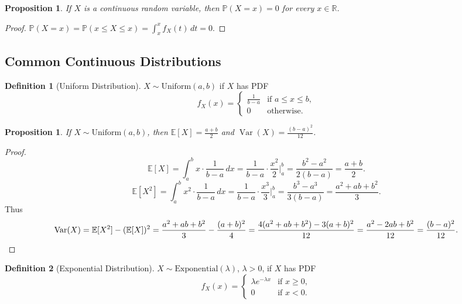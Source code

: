 \documentclass[11pt,a4paper]{article}
\theoremstyle{definition}
\newtheorem{definition}{Definition}[section]
\theoremstyle{plain}
\newtheorem{proposition}[theorem]{Proposition}
\theoremstyle{remark}
\newcommand{\R}{\mathbb{R}}
\newcommand{\E}{\mathbb{E}}
\newcommand{\Prob}{\mathbb{P}}
\DeclareMathOperator{\Var}{Var}
\begin{document}
\begin{proposition}
\label{prop:continuous_point_zero}
If $X$ is a continuous random variable, then $\Prob(X = x) = 0$ for every $x \in \R$.
\end{proposition}

\begin{proof}
$\Prob(X = x) = \Prob(x \leq X \leq x) = \int_x^x f_X(t)\,dt = 0$.
\end{proof}

\subsection{Common Continuous Distributions}

\begin{definition}[Uniform Distribution]
\label{def:uniform}
$X \sim \mathrm{Uniform}(a, b)$ if $X$ has PDF
\[
    f_X(x) = \begin{cases} \frac{1}{b - a} & \text{if } a \leq x \leq b, \\ 0 & \text{otherwise.} \end{cases}
\]
\end{definition}

\begin{proposition}
\label{prop:uniform_moments}
If $X \sim \mathrm{Uniform}(a, b)$, then $\E[X] = \frac{a+b}{2}$ and
$\Var(X) = \frac{(b-a)^2}{12}$.
\end{proposition}

\begin{proof}
\[
    \E[X] = \int_a^b x \cdot \frac{1}{b-a}\,dx = \frac{1}{b-a}\cdot\frac{x^2}{2}\bigg|_a^b
    = \frac{b^2 - a^2}{2(b-a)} = \frac{a + b}{2}.
\]
\[
    \E[X^2] = \int_a^b x^2 \cdot \frac{1}{b-a}\,dx = \frac{1}{b-a}\cdot\frac{x^3}{3}\bigg|_a^b
    = \frac{b^3 - a^3}{3(b-a)} = \frac{a^2 + ab + b^2}{3}.
\]
Thus
\[
    \Var(X) = \E[X^2] - (\E[X])^2 = \frac{a^2 + ab + b^2}{3} - \frac{(a+b)^2}{4}
    = \frac{4(a^2 + ab + b^2) - 3(a+b)^2}{12} = \frac{a^2 - 2ab + b^2}{12}
    = \frac{(b-a)^2}{12}.
    \qedhere
\]
\end{proof}

\begin{definition}[Exponential Distribution]
\label{def:exponential}
$X \sim \mathrm{Exponential}(\lambda)$, $\lambda > 0$, if $X$ has PDF
\[
    f_X(x) = \begin{cases} \lambda e^{-\lambda x} & \text{if } x \geq 0, \\ 0 & \text{if } x < 0. \end{cases}
\]
\end{definition}
\end{document}
